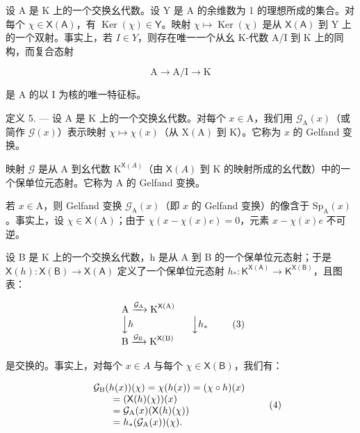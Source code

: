 设 A 是 K 上的一个交换幺代数。设 Y 是 A 的余维数为 1 的理想所成的集合。对每个 \(\chi \in \mathsf{X}(\mathsf{A})\)，有 \(\operatorname{Ker}(\chi) \in \mathsf{Y}\)。映射 \(\chi \mapsto \operatorname{Ker}(\chi)\) 是从 \(\mathsf{X}(\mathsf{A})\) 到 Y 上的一个双射。事实上，若 \(I \in Y\)，则存在唯一一个从幺 K-代数 A/I 到 K 上的同构，而复合态射

\[
\mathrm{A} \longrightarrow \mathrm{A} / \mathrm{I} \longrightarrow \mathrm{K}
\]

是 A 的以 I 为核的唯一特征标。

定义 5. --- 设 A 是 K 上的一个交换幺代数。对每个 \(x \in \mathrm{A}\)，我们用 \(\mathcal{G}_{\mathrm{A}}(x)\)（或简作 \(\mathcal{G}(x)\)）表示映射 \(\chi \mapsto \chi(x)\)（从 \(\mathrm{X}(\mathrm{A})\) 到 K）。它称为 \(x\) 的 Gelfand 变换。

映射 \(\mathcal{G}\) 是从 A 到幺代数 \(\mathrm{K}^{\mathsf{X}(A)}\)（由 \(\mathsf{X}(A)\) 到 K 的映射所成的幺代数）中的一个保单位元态射。它称为 A 的 Gelfand 变换。

若 \(x \in \mathrm{A}\)，则 Gelfand 变换 \(\mathcal{G}_{\mathrm{A}}(x)\)（即 \(x\) 的 Gelfand 变换）的像含于 \(\mathrm{Sp}_{\mathrm{A}}(x)\)。事实上，设 \(\chi \in \mathsf{X}(\mathrm{A})\)；由于 \(\chi(x - \chi(x)e) = 0\)，元素 \(x - \chi(x)e\) 不可逆。

设 B 是 K 上的一个交换幺代数，h 是从 A 到 B 的一个保单位元态射；于是 \(\mathsf{X}(h)\colon\mathsf{X}(\mathsf{B})\to\mathsf{X}(\mathsf{A})\) 定义了一个保单位元态射 \(h_{*}\colon\mathsf{K}^{\mathsf{X}(\mathsf{A})}\to\mathsf{K}^{\mathsf{X}(\mathsf{B})}\)，且图表：

\[
\begin{array}{l} \text {A} \xrightarrow {\mathcal {G} _ {\text {A}}} \text {K} ^ {\mathsf {X} (\text {A})} \\ \Big \downarrow h \qquad \qquad \qquad \Big \downarrow h _ {*} \\ \text {B} \xrightarrow {\mathcal {G} _ {\text {B}}} \text {K} ^ {\mathsf {X} (\text {B})} \end{array}\tag{3}
\]

是交换的。事实上，对每个 \(x \in A\) 与每个 \(\chi \in \mathsf{X}(\mathsf{B})\)，我们有：

\[
\begin{array}{r l} & {\mathcal {G} _ {\mathrm{B}} (h (x)) (\chi) = \chi (h (x)) = (\chi \circ h) (x)} \\ & {\qquad = (\mathsf {X} (h) (\chi)) (x)} \\ & {\qquad = \mathcal {G} _ {\mathrm{A}} (x) (\mathsf {X} (h) (\chi))} \\ & {\qquad = h _ {*} (\mathcal {G} _ {\mathrm{A}} (x)) (\chi).} \end{array}\tag{4}
\]

